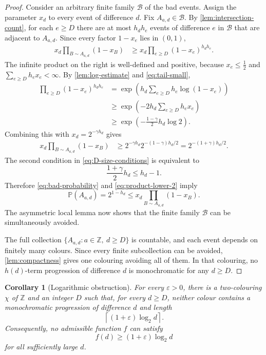 \documentclass[11pt]{article}
\newtheorem{corollary}[theorem]{Corollary}
\theoremstyle{definition}
\theoremstyle{remark}
\newcommand{\Z}{\mathbb Z}
\newcommand{\col}{\chi}
\begin{document}
\begin{proof}
Consider an arbitrary finite family $\mathcal B$ of the bad events. Assign the parameter $x_d$ to every event of difference $d$. Fix $A_{a,d}\in\mathcal B$. By \cref{lem:intersection-count}, for each $e\ge D$ there are at most $h_dh_e$ events of difference $e$ in $\mathcal B$ that are adjacent to $A_{a,d}$. Since every factor $1-x_e$ lies in $(0,1)$,
\begin{align}
 x_d\prod_{B\sim A_{a,d}}(1-x_B)
&\ge x_d\prod_{e\ge D}(1-x_e)^{h_dh_e}.\label{eq:product-lower-1}
\end{align}
The infinite product on the right is well-defined and positive, because $x_e\le\tfrac12$ and $\sum_{e\ge D}h_ex_e<\infty$. By \cref{lem:log-estimate} and \eqref{eq:tail-small},
\begin{align*}
\prod_{e\ge D}(1-x_e)^{h_dh_e}
&=\exp\left(h_d\sum_{e\ge D}h_e\log(1-x_e)\right)\\
&\ge\exp\left(-2h_d\sum_{e\ge D}h_ex_e\right)\\
&\ge\exp\left(-\frac{1-\gamma}{2}h_d\log2\right).
\end{align*}
Combining this with $x_d=2^{-\gamma h_d}$ gives
\begin{align}
 x_d\prod_{B\sim A_{a,d}}(1-x_B)
&\ge 2^{-\gamma h_d}2^{-(1-\gamma)h_d/2}
 =2^{-(1+\gamma)h_d/2}.
\label{eq:product-lower-2}
\end{align}
The second condition in \eqref{eq:D-size-conditions} is equivalent to
\[
\frac{1+\gamma}{2}h_d\le h_d-1.
\]
Therefore \eqref{eq:bad-probability} and \eqref{eq:product-lower-2} imply
\[
\mathbb P(A_{a,d})=2^{1-h_d}
\le x_d\prod_{B\sim A_{a,d}}(1-x_B).
\]
The asymmetric local lemma now shows that the finite family $\mathcal B$ can be simultaneously avoided.

The full collection $\{A_{a,d}:a\in\Z,\ d\ge D\}$ is countable, and each event depends on finitely many colours. Since every finite subcollection can be avoided, \cref{lem:compactness} gives one colouring avoiding all of them. In that colouring, no $h(d)$-term progression of difference $d$ is monochromatic for any $d\ge D$.
\end{proof}

\begin{corollary}[Logarithmic obstruction]\label{cor:log-obstruction}
For every $\varepsilon>0$, there is a two-colouring $\col$ of $\Z$ and an integer $D$ such that, for every $d\ge D$, neither colour contains a monochromatic progression of difference $d$ and length
\[
\left\lceil(1+\varepsilon)\log_2d\right\rceil.
\]
Consequently, no admissible function $f$ can satisfy
\begin{equation}\label{eq:eventual-log-lower}
f(d)\ge(1+\varepsilon)\log_2d
\end{equation}
for all sufficiently large $d$.
\end{corollary}
\end{document}
